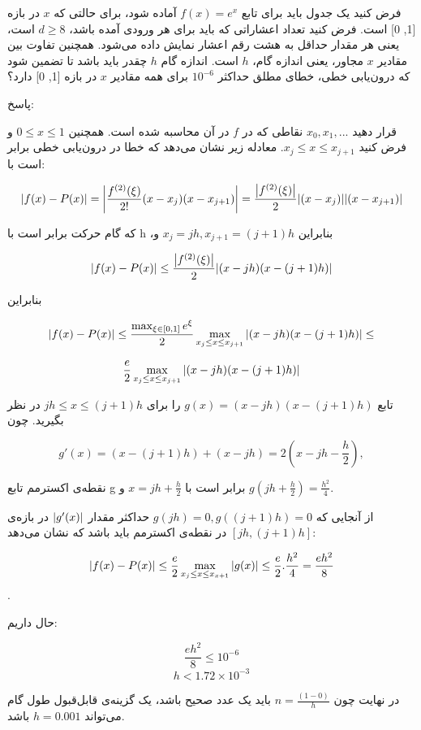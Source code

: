 فرض کنید یک جدول باید برای تابع 
\(f (x) = e^{x}\)
آماده شود، برای حالتی که 
\(x\)
در بازه [1, 0] است. 
فرض کنید تعداد اعشاراتی که باید برای هر ورودی آمده باشد، 
\(d \geq 8\)
است، یعنی هر مقدار حداقل به هشت رقم اعشار نمایش داده می‌شود.
همچنین تفاوت بین مقادیر 
\(x\)
مجاور، یعنی اندازه گام، 
\(h\)
است. اندازه گام 
\(h\)
چقدر باید باشد تا تضمین شود که درون‌یابی خطی، خطای مطلق حداکثر 
\(10^{-6}\)
برای همه مقادیر
\(x\)
در بازه [1, 0] دارد؟

\begin{comment}
\end{comment}
پاسخ:


    قرار دهید 
    $x_{0}, x_{1}, ...$
    نقاطی که در 
    $f$
    در آن محاسبه شده است.
    همچنین  $0 \leq x \leq 1 $
    و فرض کنید 
    $x_{j} \leq x \leq x_{j + 1} $.
    معادله زیر نشان می‌دهد که خطا در درون‌یابی خطی برابر است با:

    $$\abs{f(x) - P(x)} = \abs{\frac{f^{(2)}(\xi)}{2!}(x - x_{j})(x - x_{j+1})} = \frac{\abs{f^{(2)}(\xi)}}{2} \abs{(x - x_{j})}\abs{(x - x_{j+1})}$$

    که گام حرکت برابر است با h
    ،بنابراین $x_{j} = jh, x_{j + 1} = (j + 1)h$
    و 

    $$\abs{f(x) - P(x)} \leq \frac{\abs{f^{(2)}(\xi)}}{2} \abs{(x - jh)(x - (j + 1)h)}$$

    بنابراین

    $$\abs{f(x) - P(x)} \leq \frac{\max_{\xi \in [0, 1]} e^{\xi}}{2} \max_{x_{j} \leq x \leq x_{j + 1}} \abs{(x - jh)(x - (j + 1)h)} \leq $$
    
    $$\frac{e}{2} \max_{x_{j} \leq x \leq x_{j + 1}} \abs{(x - jh)(x - (j + 1)h)}$$

    تابع 
    $g(x) = (x - jh) (x - (j + 1)h)$
    را برای $jh \leq x \leq (j + 1)h$
    در نظر بگیرید.  چون

    $$g'(x) = (x - (j + 1)h) + (x - jh) = 2 (x - jh - \frac{h}{2}),$$

    نقطه‌ی اکسترمم تابع g برابر است با $x = jh + \frac{h}{2}$ و $g(jh + \frac{h}{2}) = \frac{h^{2}}{4}$.

    از آنجایی که $g(jh) = 0, g((j + 1)h) = 0$ حداکثر مقدار $\abs{g'(x)}$  در بازه‌ی  $[jh, (j + 1)h]$ در نقطه‌ی اکسترمم باید باشد که نشان می‌دهد: 

    $$\abs{f(x) - P(x)} \leq \frac{e}{2} \max_{x_{j} \leq x \leq x_{x + 1}} \abs{g(x)} \leq \frac{e}{2}.\frac{h^{2}}{4} = \frac{eh^{2}}{8}$$.

    حال داریم:

    $$\frac{eh^{2}}{8} \leq 10^{-6}$$
    $$ h < 1.72 \times 10 ^ {-3}$$

    در نهایت چون $n = \frac{(1 - 0)}{h}$ باید یک عدد صحیح باشد، یک گزینه‌ی قابل‌قبول طول گام می‌تواند $h = 0.001$ باشد.
